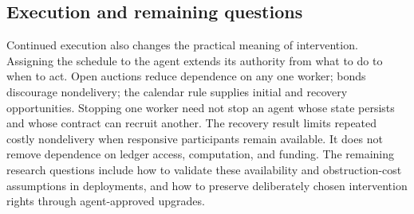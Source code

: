 \documentclass[10pt,letterpaper]{article}
\begin{document}
\subsection{Execution and remaining questions}
Continued execution also changes the practical meaning of intervention. Assigning the schedule to the agent extends its authority from what to do to when to act. Open auctions reduce dependence on any one worker; bonds discourage nondelivery; the calendar rule supplies initial and recovery opportunities. Stopping one worker need not stop an agent whose state persists and whose contract can recruit another. The recovery result limits repeated costly nondelivery when responsive participants remain available. It does not remove dependence on ledger access, computation, and funding. The remaining research questions include how to validate these availability and obstruction-cost assumptions in deployments, and how to preserve deliberately chosen intervention rights through agent-approved upgrades.

\begingroup
\small
\setlength{\bibsep}{3pt}
\raggedright
{}


\endgroup
\end{document}
